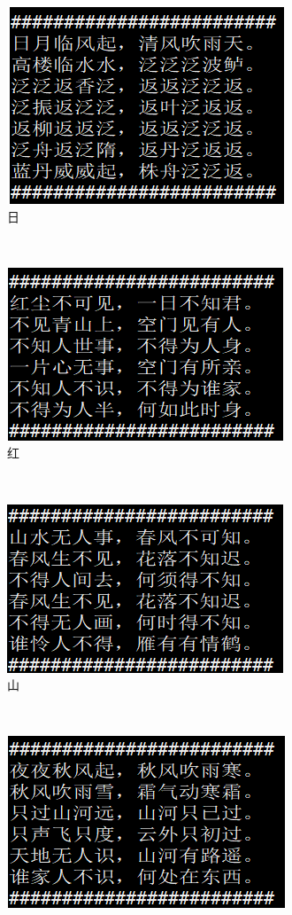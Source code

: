 \documentclass[10pt]{article}
\begin{document}
\begin{figure}[H]
\centering
\begin{subfigure}[t]{0.24\textwidth}
\centering
\includegraphics[scale=.6]{gru_1.png}
\caption{日}
\label{gru_1}
\end{subfigure}%
~
\begin{subfigure}[t]{0.23\textwidth}
\centering
\includegraphics[scale=.6]{gru_2.png}
\caption{红}
\label{gru_2}
\end{subfigure}
~
\begin{subfigure}[t]{0.23\textwidth}
\centering
\includegraphics[scale=.6]{gru_3.png}
\caption{山}
\label{gru_3}
\end{subfigure}
~
\begin{subfigure}[t]{0.23\textwidth}
\centering
\includegraphics[scale=.6]{gru_4.png}

\end{subfigure}
\end{figure}
\end{document}
